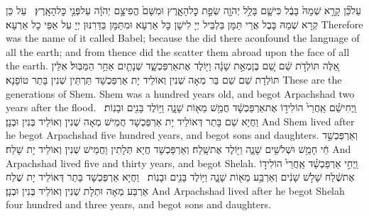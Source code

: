 {עַל\maqqaf כֵּ֞ן קָרָ֤א שְׁמָהּ֙ בָּבֶ֔ל כִּי\maqqaf שָׁ֛ם בָּלַ֥ל יְהֹוָ֖ה שְׂפַ֣ת כׇּל\maqqaf הָאָ֑רֶץ וּמִשָּׁם֙ הֱפִיצָ֣ם יְהֹוָ֔ה עַל\maqqaf פְּנֵ֖י כׇּל\maqqaf הָאָֽרֶץ׃ \petucha }
{עַל כֵּן קְרָא שְׁמַהּ בָּבֶל אֲרֵי תַּמָּן בַּלְבֵּיל יְיָ לִישָׁן כָּל אַרְעָא וּמִתַּמָּן בַּדַּרִנּוּן יְיָ עַל אַפֵּי כָל אַרְעָא׃}
{Therefore was the name of it called Babel; because the \lord\space did there aconfound the language of all the earth; and from thence did the \lord\space scatter them abroad upon the face of all the earth.}{}
{אֵ֚לֶּה תּוֹלְדֹ֣ת שֵׁ֔ם שֵׁ֚ם בֶּן\maqqaf מְאַ֣ת שָׁנָ֔ה וַיּ֖וֹלֶד אֶת\maqqaf אַרְפַּכְשָׁ֑ד שְׁנָתַ֖יִם אַחַ֥ר הַמַּבּֽוּל׃}
{אִלֵּין תּוֹלְדָת שֵׁם שֵׁם בַּר מְאָה שְׁנִין וְאוֹלֵיד יָת אַרְפַּכְשָׁד תַּרְתֵּין שְׁנִין בָּתַר טוֹפָנָא׃}
{These are the generations of Shem. Shem was a hundred years old, and begot Arpachshad two years after the flood.}{}
{וַֽיְחִי\maqqaf שֵׁ֗ם אַֽחֲרֵי֙ הוֹלִיד֣וֹ אֶת\maqqaf אַרְפַּכְשָׁ֔ד חֲמֵ֥שׁ מֵא֖וֹת שָׁנָ֑ה וַיּ֥וֹלֶד בָּנִ֖ים וּבָנֽוֹת׃ \setuma }
{וַחֲיָא שֵׁם בָּתַר דְּאוֹלֵיד יָת אַרְפַּכְשָׁד חֲמֵישׁ מְאָה שְׁנִין וְאוֹלֵיד בְּנִין וּבְנָן׃}
{And Shem lived after he begot Arpachshad five hundred years, and begot sons and daughters.}{}
{וְאַרְפַּכְשַׁ֣ד חַ֔י חָמֵ֥שׁ וּשְׁלֹשִׁ֖ים שָׁנָ֑ה וַיּ֖וֹלֶד אֶת\maqqaf שָֽׁלַח׃}
{וְאַרְפַּכְשָׁד חֲיָא תְּלָתִין וַחֲמֵישׁ שְׁנִין וְאוֹלֵיד יָת שָׁלַח׃}
{And Arpachshad lived five and thirty years, and begot Shelah.}{}
{וַֽיְחִ֣י אַרְפַּכְשַׁ֗ד אַֽחֲרֵי֙ הוֹלִיד֣וֹ אֶת\maqqaf שֶׁ֔לַח שָׁלֹ֣שׁ שָׁנִ֔ים וְאַרְבַּ֥ע מֵא֖וֹת שָׁנָ֑ה וַיּ֥וֹלֶד בָּנִ֖ים וּבָנֽוֹת׃ \setuma }
{וַחֲיָא אַרְפַּכְשָׁד בָּתַר דְּאוֹלֵיד יָת שֶׁלַח אַרְבַּע מְאָה וּתְלָת שְׁנִין וְאוֹלֵיד בְּנִין וּבְנָן׃}
{And Arpachshad lived after he begot Shelah four hundred and three years, and begot sons and daughters.}{}
